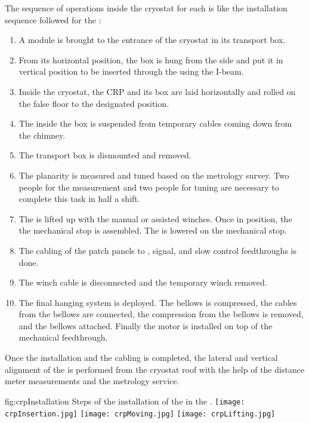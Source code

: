 The sequence of operations inside the cryostat for each  is like the installation sequence followed for the :
\begin{enumerate}
\item A  module is brought to the entrance of the cryostat in its transport box.
\item From its horizontal position, the box is hung from the side and put it in vertical position to be inserted through the  using the  I-beam.
\item Inside the cryostat, the CRP and its box are laid horizontally and rolled on the false floor to the designated position.
\item The  inside the box is suspended from temporary cables coming down from the chimney.
\item The transport box is dismounted and removed.
\item The  planarity is measured and tuned based on the metrology survey.
Two people for the measurement and two people for tuning are necessary to complete this task in half a shift. %
\item The  is lifted up with the manual or assisted winches. Once in position, the the mechanical stop is assembled. The  is lowered on the mechanical stop.
\item The cabling of the  patch panels to , signal, and slow control feedthroughs is done.
\item The winch cable is disconnected and the temporary winch removed.
\item The final hanging system is deployed. The bellows is compressed, the cables from the bellows are connected, the compression from the bellows is removed, and the bellows attached.  Finally the motor is installed on top of the mechanical feedthrough.
\end{enumerate}
Once the installation and the cabling is completed, the lateral and vertical alignment of the  is performed from the cryostat roof with the help of the distance meter measurements and the metrology service.

\begin{dunefigure}{fig:crpInstallation}
{Steps of the installation of the  in the .}
\texttt{[image: crpInsertion.jpg]}
\texttt{[image: crpMoving.jpg]}
\texttt{[image: crpLifting.jpg]}
\end{dunefigure}

